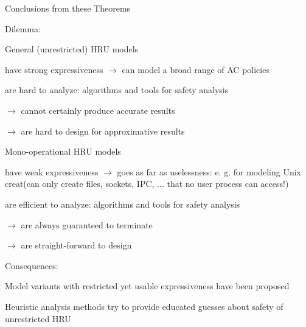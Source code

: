 \documentclass[a4paper]{article}
\begin{document}
\begin{multicols}{3}
    Conclusions from these Theorems
    \begin{itemize*}
        \item Dilemma:
              \begin{itemize*}
                  \item General (unrestricted) HRU models
                        \begin{itemize*}
                            \item have strong expressiveness $\rightarrow$  can model a broad range of AC policies
                            \item are hard to analyze: algorithms and tools for safety analysis
                                  \begin{itemize*}
                                      \item $\rightarrow$  cannot certainly produce accurate results
                                      \item $\rightarrow$  are hard to design for approximative results
                                  \end{itemize*}
                        \end{itemize*}
                  \item Mono-operational HRU models
                        \begin{itemize*}
                            \item have weak expressiveness $\rightarrow$  goes as far as uselessness: e. g. for modeling Unix creat(can only create files, sockets, IPC, ... that no user process can access!)
                            \item are efficient to analyze: algorithms and tools for safety analysis
                            \item $\rightarrow$  are always guaranteed to terminate
                            \item $\rightarrow$  are straight-forward to design
                        \end{itemize*}
              \end{itemize*}
    \end{itemize*}

    Consequences:
    \begin{itemize*}
        \item Model variants with restricted yet usable expressiveness have been proposed
        \item Heuristic analysis methods try to provide educated guesses about safety of unrestricted HRU
    \end{itemize*}



\end{multicols}
\end{document}
